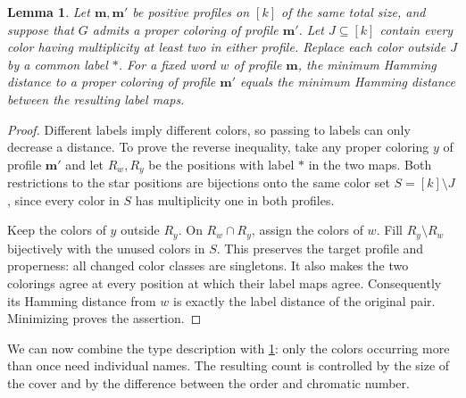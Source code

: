 \documentclass[10pt,a4paper]{amsart}
\numberwithin{equation}{section}
\newtheorem{lemma}[theorem]{Lemma}
\theoremstyle{definition}
\theoremstyle{remark}
\begin{document}
\begin{lemma}\label{rec:singleton}
Let $\mathbf m,\mathbf m'$ be positive profiles on $[k]$ of the
same total size, and suppose that $G$ admits a proper coloring of
profile $\mathbf m'$. Let $J\subseteq[k]$ contain every color having
multiplicity at least two in either profile. Replace each color
outside $J$ by a common label $*$. For a fixed word $w$ of profile
$\mathbf m$, the minimum Hamming distance to a proper coloring of
profile $\mathbf m'$ equals the minimum Hamming distance between
the resulting label maps.
\end{lemma}
\begin{proof}
Different labels imply different colors, so passing to labels can
only decrease a distance. To prove the reverse inequality, take any
proper coloring $y$ of profile $\mathbf m'$ and let $R_w,R_y$ be
the positions with label $*$ in the two maps. Both restrictions
to the star positions are bijections onto the same color set
$S=[k]\setminus J$, since every color in $S$ has multiplicity one
in both profiles.

Keep the colors of $y$ outside $R_y$. On $R_w\cap R_y$, assign the
colors of $w$. Fill $R_y\setminus R_w$ bijectively with the unused
colors in $S$. This preserves the target profile and properness:
all changed color classes are singletons. It also makes the two
colorings agree at every position at which their label maps agree.
Consequently its Hamming distance from $w$ is exactly the label
distance of the original pair. Minimizing proves the assertion.
\end{proof}

We can now combine the type description with \cref{rec:singleton}:
only the colors occurring more than once need individual names.
The resulting count is controlled by the size of the cover and by
the difference between the order and chromatic number.
\end{document}
